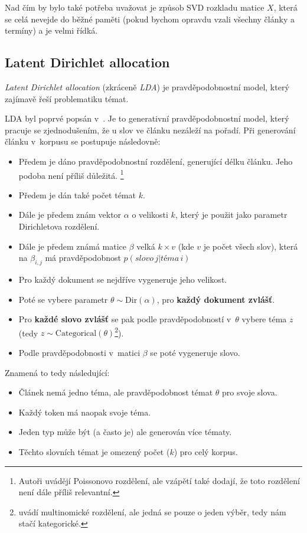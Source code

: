 \documentclass[12pt,a4paper]{report}
\begin{document}
Nad čím by bylo také potřeba uvažovat je způsob SVD rozkladu matice $X$, která se celá nevejde do běžné paměti (pokud bychom opravdu vzali všechny články a termíny) a je velmi řídká. 


\subsection{Latent Dirichlet allocation}
\emph{Latent Dirichlet allocation} (zkráceně \emph{LDA}) je pravděpodobnostní model, který zajímavě řeší problematiku témat.

LDA byl poprvé popsán v~\cite{lda}. Je to generativní pravděpodobnostní model, který pracuje se zjednodušením, že u slov ve článku nezáleží na pořadí. Při generování článku v~korpusu se postupuje následovně:

\begin{itemize}
    \item Předem je dáno pravděpodobnostní rozdělení, generující délku článku. Jeho podoba není příliš důležitá. \footnote{Autoři \cite{lda} uvádějí Poissonovo rozdělení, ale vzápětí také dodají, že toto rozdělení není dále příliš relevantní.}
    \item Předem je dán také počet témat $k$.
    \item Dále je předem znám vektor $\alpha$ o velikosti $k$, který je použit jako parametr Dirichletova rozdělení.
    \item Dále je předem známá matice $\beta$ velká $k \times v$ (kde $v$ je počet všech slov), která na $\beta_{i,j}$ má pravděpodobnost $p(slovo\,j|téma\,i)$
    \item Pro každý dokument se nejdříve vygeneruje jeho velikost.
    \item Poté se vybere parametr $\theta \sim \mathrm{Dir}\left(\alpha\right)$, pro \textbf{každý dokument zvlášť}.
    \item Pro \textbf{každé slovo zvlášť} se pak podle pravděpodobností v~$\theta$ vybere téma $z$ (tedy $z \sim \mathrm{Categorical}(\theta)$\footnote{\cite{lda} uvádí multinomické rozdělení, ale jedná se pouze o jeden výběr, tedy nám stačí kategorické.}).
    \item Podle pravděpodobnosti v~matici $\beta$ se poté vygeneruje slovo.
\end{itemize}

Znamená to tedy následující:
\begin{itemize}
    \item Článek nemá jedno téma, ale pravděpodobnost témat $\theta$ pro svoje slova.
    \item Každý token má naopak svoje téma.
    \item Jeden typ může být (a často je) ale generován více tématy.
    \item Těchto slovních témat je omezený počet ($k$) pro celý korpus.
\end{itemize}
\end{document}
